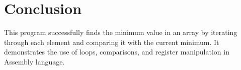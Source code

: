\documentclass[a4paper,12pt]{report}
\begin{document}
\section{Conclusion}
This program successfully finds the minimum value in an array by iterating through each element and comparing it with the current minimum. It demonstrates the use of loops, comparisons, and register manipulation in Assembly language.
\end{document}
